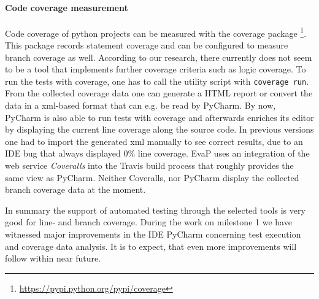\paragraph{Code coverage measurement}
Code coverage of python projects can be measured with the coverage package%
\footnote{\url{https://pypi.python.org/pypi/coverage}}.
This package records statement coverage and can be configured to measure branch coverage as well.
According to our research, there currently does not seem to be a tool that implements further coverage criteria such as logic coverage.
To run the tests with coverage, one has to call the utility script with \texttt{coverage run}.
From the collected coverage data one can generate a HTML report or convert the data in a xml-based format that can e.g. be read by PyCharm.
By now, PyCharm is also able to run tests with coverage and afterwards enriches its editor by displaying the current line coverage along the source code.
In previous versions one had to import the generated xml manually to see correct results, due to an IDE bug that always displayed 0\% line coverage.
EvaP uses an integration of the web service \textit{Coveralls} into the Travis build process that roughly provides the same view as PyCharm.
Neither Coveralls, nor PyCharm display the collected branch coverage data at the moment.

In summary the support of automated testing through the selected tools is very good for line- and branch coverage.
During the work on milestone 1 we have witnessed major improvements in the IDE PyCharm concerning test execution and coverage data analysis.
It is to expect, that even more improvements will follow within near future.
